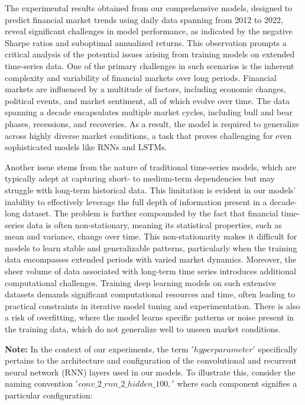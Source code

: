 \documentclass[10pt,twocolumn,letterpaper]{article}
\begin{document}
The experimental results obtained from our comprehensive models, designed to predict financial market trends using daily data spanning from 2012 to 2022, reveal significant challenges in model performance, as indicated by the negative Sharpe ratios and suboptimal annualized returns. This observation prompts a critical analysis of the potential issues arising from training models on extended time-series data. One of the primary challenges in such scenarios is the inherent complexity and variability of financial markets over long periods. Financial markets are influenced by a multitude of factors, including economic changes, political events, and market sentiment, all of which evolve over time. The data spanning a decade encapsulates multiple market cycles, including bull and bear phases, recessions, and recoveries. As a result, the model is required to generalize across highly diverse market conditions, a task that proves challenging for even sophisticated models like RNNs and LSTMs.

Another issue stems from the nature of traditional time-series models, which are typically adept at capturing short- to medium-term dependencies but may struggle with long-term historical data. This limitation is evident in our models’ inability to effectively leverage the full depth of information present in a decade-long dataset. The problem is further compounded by the fact that financial time-series data is often non-stationary, meaning its statistical properties, such as mean and variance, change over time. This non-stationarity makes it difficult for models to learn stable and generalizable patterns, particularly when the training data encompasses extended periods with varied market dynamics. Moreover, the sheer volume of data associated with long-term time series introduces additional computational challenges. Training deep learning models on such extensive datasets demands significant computational resources and time, often leading to practical constraints in iterative model tuning and experimentation. There is also a risk of overfitting, where the model learns specific patterns or noise present in the training data, which do not generalize well to unseen market conditions.

\textbf{Note:} In the context of our experiments, the term $'hyperparameter'$ specifically pertains to the architecture and configuration of the convolutional and recurrent neural network (RNN) layers used in our models. To illustrate this, consider the naming convention $'conv\_2\_rnn\_2\_hidden\_100,'$ where each component signifies a particular configuration:
\end{document}
